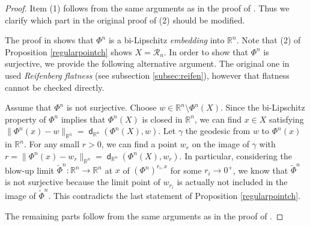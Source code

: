 \documentclass[11pt,reqno]{amsart}
\theoremstyle{definition}
\numberwithin{equation}{section}
\DeclareMathOperator{\dist}{\mathsf{d}}
\begin{document}
\begin{proof}
Item (1) follows from the same arguments as in the proof of \cite[Theorem 4.8]{HS}.
Thus we clarify which part in the original proof of (2) should be modified. 

The proof in \cite[Theorem 4.8]{HS} shows that $\Phi^n$ is a bi-Lipschitz \textit{embedding} into $\mathbb{R}^n$. Note that (2) of Proposition \ref{regularpointch}  shows $X=\mathcal{R}_n$.
    In order to show that $\Phi^n$ is surjective, we provide the following alternative argument. The original one in \cite[Theorem 4.8]{HS} used  \textit{Reifenberg flatness} (see subsection \ref{subsec:reifen}), however that flatness cannot be checked   directly.

    Assume that $\Phi^n$ is not surjective. Choose $w \in \mathbb{R}^n\setminus \Phi^n(X)$. Since the bi-Lipschitz property of $\Phi^n$ implies that $\Phi^n(X)$ is closed in $\mathbb{R}^n$, we can find $x \in X$ satisfying
    $
        \|\Phi^n(x)-w\|_{\mathbb{R}^n}=\dist_{\mathbb{R}^n}(\Phi^n(X), w).
    $
    Let $\gamma$ the geodesic from $w$ to $\Phi^n(x)$ in $\mathbb{R}^n$. For any small $r>0$, we can find a point $w_r$ on the image of $\gamma$ with
    $
        r=\|\Phi^n(x)-w_r\|_{\mathbb{R}^n}=\dist_{\mathbb{R}^n}(\Phi^n(X), w_r).
    $
    In particular, considering the blow-up limit $\tilde \Phi^n:\mathbb{R}^n \to \mathbb{R}^n$ at $x$ of $(\Phi^n)^{r_i, x}$ for some $r_i \to 0^+$, we know that $\tilde \Phi^n$ is not surjective because the limit point of $w_{r_i}$ is actually not included in the image of $\tilde \Phi^n$. This contradicts the last statement of Proposition \ref{regularpointch}.

    The remaining parts follow from the same arguments as in the proof of \cite[Theorem 4.8]{HS}.
\end{proof}
\end{document}
